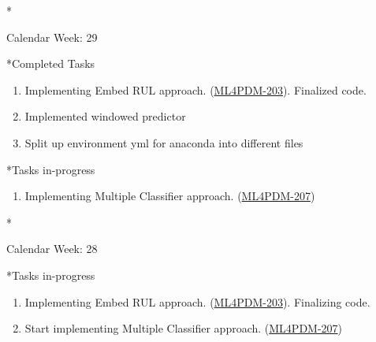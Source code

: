 \documentclass[11pt,a4paper]{article}
\begin{document}
\newpage
\begin{section}*{Calendar Week: 29 \hfill \date{23 July, 2021}}
 \begin{refsection}
   \begin{subsection}*{Completed Tasks}
     \begin{enumerate}
       \item
             Implementing Embed RUL approach. (\href{https://ml4pdm.atlassian.net/browse/ML4PDM-203}{ML4PDM-203}). Finalized code.
       \item
             Implemented windowed predictor
       \item
             Split up environment yml for anaconda into different files
     \end{enumerate}
   \end{subsection}
   \begin{subsection}*{Tasks in-progress}
     \begin{enumerate}
       \item
             Implementing Multiple Classifier approach. (\href{https://ml4pdm.atlassian.net/browse/ML4PDM-207}{ML4PDM-207})
     \end{enumerate}
   \end{subsection}
 \end{refsection}
\end{section}

\newpage
\begin{section}*{Calendar Week: 28 \hfill \date{16 July, 2021}}
 \begin{refsection}
   \begin{subsection}*{Tasks in-progress}
     \begin{enumerate}
       \item
             Implementing Embed RUL approach. (\href{https://ml4pdm.atlassian.net/browse/ML4PDM-203}{ML4PDM-203}). Finalizing code.
       \item
             Start implementing Multiple Classifier approach. (\href{https://ml4pdm.atlassian.net/browse/ML4PDM-207}{ML4PDM-207})
     \end{enumerate}
   \end{subsection}
 \end{refsection}
\end{section}
\end{document}
